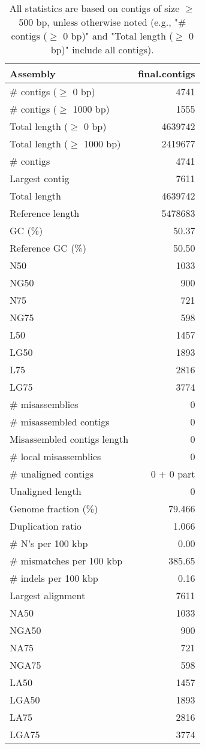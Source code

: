 \documentclass[12pt,a4paper]{article}
\begin{document}
\begin{table}[ht]
\begin{center}
\caption{All statistics are based on contigs of size $\geq$ 500 bp, unless otherwise noted (e.g., "\# contigs ($\geq$ 0 bp)" and "Total length ($\geq$ 0 bp)" include all contigs).}
\begin{tabular}{|l*{1}{|r}|}
\hline
Assembly & final.contigs \\ \hline
\# contigs ($\geq$ 0 bp) & 4741 \\ \hline
\# contigs ($\geq$ 1000 bp) & 1555 \\ \hline
Total length ($\geq$ 0 bp) & 4639742 \\ \hline
Total length ($\geq$ 1000 bp) & 2419677 \\ \hline
\# contigs & 4741 \\ \hline
Largest contig & 7611 \\ \hline
Total length & 4639742 \\ \hline
Reference length & 5478683 \\ \hline
GC (\%) & 50.37 \\ \hline
Reference GC (\%) & 50.50 \\ \hline
N50 & 1033 \\ \hline
NG50 & 900 \\ \hline
N75 & 721 \\ \hline
NG75 & 598 \\ \hline
L50 & 1457 \\ \hline
LG50 & 1893 \\ \hline
L75 & 2816 \\ \hline
LG75 & 3774 \\ \hline
\# misassemblies & 0 \\ \hline
\# misassembled contigs & 0 \\ \hline
Misassembled contigs length & 0 \\ \hline
\# local misassemblies & 0 \\ \hline
\# unaligned contigs & 0 + 0 part \\ \hline
Unaligned length & 0 \\ \hline
Genome fraction (\%) & 79.466 \\ \hline
Duplication ratio & 1.066 \\ \hline
\# N's per 100 kbp & 0.00 \\ \hline
\# mismatches per 100 kbp & 385.65 \\ \hline
\# indels per 100 kbp & 0.16 \\ \hline
Largest alignment & 7611 \\ \hline
NA50 & 1033 \\ \hline
NGA50 & 900 \\ \hline
NA75 & 721 \\ \hline
NGA75 & 598 \\ \hline
LA50 & 1457 \\ \hline
LGA50 & 1893 \\ \hline
LA75 & 2816 \\ \hline
LGA75 & 3774 \\ \hline
\end{tabular}
\end{center}
\end{table}
\end{document}

